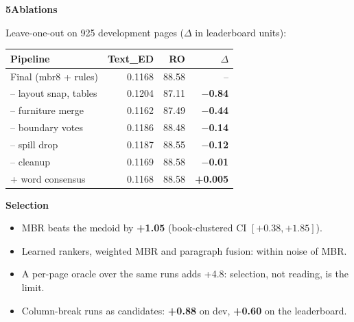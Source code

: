 \documentclass{article}
\newcommand{\tsmall}{\fontsize{24}{29}\selectfont}
\newcommand{\up}[1]{\textcolor{green!45!black}{\textbf{#1}}}
\newcommand{\dn}[1]{\textcolor{red!65!black}{\textbf{#1}}}
\newcommand{\ted}{Text\_ED}
\newcommand{\blk}[2]{%
  \par\vspace{8mm}%
  {\fontsize{44}{50}\selectfont\bfseries\textcolor{accent}{#1\hspace{6mm}#2}}\par
  \vspace{-2mm}{\color{accent}\rule{\linewidth}{1mm}}\par\vspace{0mm}}
\begin{document}
\begin{minipage}[t]{245mm}
\blk{5}{Ablations}
Leave-one-out on 925 development pages ($\Delta$ in leaderboard units):

{\tsmall
\begin{tabularx}{\linewidth}{@{}Xrrr@{}}
\toprule
Pipeline & \ted & RO & $\Delta$ \\
\midrule
Final (mbr8 + rules) & 0.1168 & 88.58 & -- \\
\quad -- layout snap, tables & 0.1204 & 87.11 & \dn{$-$0.84} \\
\quad -- furniture merge & 0.1162 & 87.49 & \dn{$-$0.44} \\
\quad -- boundary votes & 0.1186 & 88.48 & \dn{$-$0.14} \\
\quad -- spill drop & 0.1187 & 88.55 & \dn{$-$0.12} \\
\quad -- cleanup & 0.1169 & 88.58 & \dn{$-$0.01} \\
\quad + word consensus & 0.1168 & 88.58 & \up{+0.005} \\
\bottomrule
\end{tabularx}\par}\vspace{3mm}

\begin{keybox}
\textbf{\textcolor{accent}{Selection}}
\begin{itemize}
  \item MBR beats the medoid by \up{+1.05} (book-clustered CI $[+0.38, +1.85]$).
  \item Learned rankers, weighted MBR and paragraph fusion: within noise of MBR.
  \item A per-page oracle over the same runs adds +4.8: selection, not reading, is the limit.
  \item Column-break runs as candidates: \up{+0.88} on dev, \up{+0.60} on the leaderboard.
\end{itemize}
\end{keybox}
\end{minipage}%
\hfill
\end{document}
